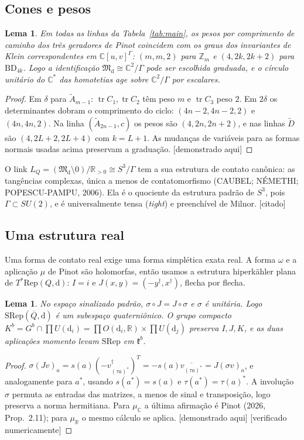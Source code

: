 \documentclass[11pt]{article}
\newtheorem{lemma}[theorem]{Lema}
\theoremstyle{definition}
\theoremstyle{remark}
\newcommand{\tagP}{\textsf{\small[demonstrado aqui]}}
\newcommand{\tagC}{\textsf{\small[citado]}}
\newcommand{\tagN}{\textsf{\small[verificado numericamente]}}
\newcommand{\C}{\mathbb{C}}\newcommand{\R}{\mathbb{R}}\newcommand{\Z}{\mathbb{Z}}
\newcommand{\M}{\mathfrak{M}}\newcommand{\Rep}{\mathrm{Rep}}\newcommand{\SRep}{\mathrm{SRep}}
\newcommand{\BD}{\mathrm{BD}}
\begin{document}
\subsection{Cones e pesos}
\begin{lemma}\label{lem:weights}
Em todas as linhas da Tabela~\ref{tab:main}, os pesos por comprimento de caminho dos três geradores de Pinot coincidem com os graus dos invariantes de Klein correspondentes em $\C[u,v]^\Gamma$: $(m,m,2)$ para $\Z_m$ e $(4,2k,2k+2)$ para $\BD_{4k}$. Logo a identificação $\M_{\mathrm d}\cong\C^2/\Gamma$ pode ser escolhida graduada, e o círculo unitário do $\C^*$ das homotetias age sobre $\C^2/\Gamma$ por escalares.
\end{lemma}
\begin{proof}
Em $\delta$ para $\widetilde A_{m-1}$: $\operatorname{tr}C_1,\operatorname{tr}C_2$ têm peso $m$ e $\operatorname{tr}C_3$ peso $2$. Em $2\delta$ os determinantes dobram o comprimento do ciclo: $(4n-2,4n-2,2)$ e $(4n,4n,2)$. Na linha $(\widetilde A_{2n-1},c)$ os pesos são $(4,2n,2n+2)$, e nas linhas $\widetilde D$ são $(4,2L+2,2L+4)$ com $k=L+1$. As mudanças de variáveis para as formas normais usadas acima preservam a graduação. \tagP
\end{proof}

O link $L_Q=(\M_{\mathrm d}\setminus0)/\R_{>0}\cong S^3/\Gamma$ tem a sua estrutura de contato canônica: as tangências complexas, única a menos de contatomorfismo (CAUBEL; NÉMETHI; POPESCU-PAMPU, 2006). Ela é o quociente da estrutura padrão de $S^3$, pois $\Gamma\subset SU(2)$, e é universalmente tensa (\emph{tight}) e preenchível de Milnor. \tagC

\subsection{Uma estrutura real}
Uma forma de contato real exige uma forma simplética exata real. A forma $\omega$ e a aplicação $\mu$ de Pinot são holomorfas, então usamos a estrutura hiperkähler plana de $T^*\Rep(Q,\mathrm d)$: $I=i$ e $J(x,y)=(-y^\dagger,x^\dagger)$, flecha por flecha.

\begin{lemma}\label{lem:quat}
No espaço sinalizado padrão, $\sigma\circ J=J\circ\sigma$ e $\sigma$ é unitária. Logo $\SRep(\overline Q,\mathrm d)$ é um subespaço quaterniônico. O grupo compacto $K^b=G^b\cap\prod U(\mathrm d_i)=\prod O(\mathrm d_i,\R)\times\prod U(\mathrm d_j)$ preserva $I,J,K$, e as duas aplicações momento levam $\SRep$ em $\mathfrak k^b$.
\end{lemma}
\begin{proof}
$\sigma(Jv)_a=s(a)(-v_{(\tau a)^*}^\dagger)^T=-s(a)\overline{v_{(\tau a)^*}}=J(\sigma v)_a$, e analogamente para $a^*$, usando $s(a^*)=s(a)$ e $\tau(a^*)=\tau(a)^*$. A involução $\sigma$ permuta as entradas das matrizes, a menos de sinal e transposição, logo preserva a norma hermitiana. Para $\mu_\C$ a última afirmação é Pinot (2026, Prop.~2.11); para $\mu_\R$ o mesmo cálculo se aplica. \tagP{} \tagN
\end{proof}
\end{document}
